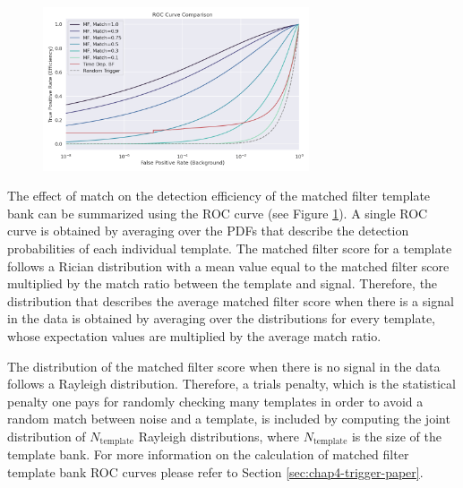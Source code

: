 \begin{figure}[htbp]
    \centering
    \includegraphics*[width=0.7\textwidth]{figs/Chapter-4/220223_mf_roc_curve_comparison_with_bf.png}
    \caption{\label{fig:chap4-mf-roc-curve-match-analysis}}
\end{figure}

The effect of match on the detection efficiency of the matched filter template bank can be summarized using the ROC curve (see Figure \ref{fig:chap4-mf-roc-curve-match-analysis}). A single ROC curve is obtained by averaging over the PDFs that describe the detection probabilities of each individual template. The matched filter score for a template follows a Rician distribution with a mean value equal to the matched filter score multiplied by the match ratio between the template and signal. Therefore, the distribution that describes the average matched filter score when there is a signal in the data is obtained by averaging over the distributions for every template, whose expectation values are multiplied by the average match ratio.

The distribution of the matched filter score when there is no signal in the data follows a Rayleigh distribution. Therefore, a trials penalty, which is the statistical penalty one pays for randomly checking many templates in order to avoid a random match between noise and a template, is included by computing the joint distribution of $N_\mathrm{template}$ Rayleigh distributions, where $N_\mathrm{template}$ is the size of the template bank. For more information on the calculation of matched filter template bank ROC curves please refer to Section \ref{sec:chap4-trigger-paper}.

